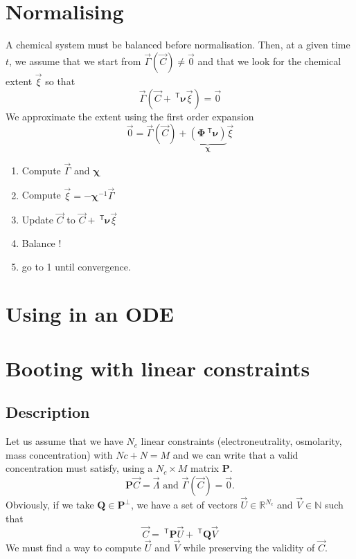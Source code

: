 \documentclass[aps]{revtex4}
\newcommand{\mymat}[1]{\bm{#1}}
\newcommand{\mytrn}[1]{~^{\mathsf{T}}{#1}}
\begin{document}
\section{Normalising}
A chemical system must be balanced before normalisation.
Then, at a given time $t$, we assume that we start from
$\vec{\Gamma}\left(\vec{C}\right)\not=\vec{0}$  and that we look for the chemical
extent $\vec{\xi}$ so that
\begin{equation}
	\vec{\Gamma}\left(\vec{C}+\mytrn{\mymat{\nu}}\vec{\xi}\right) = \vec{0}
\end{equation}
We approximate the extent using the first order expansion
\begin{equation}
	\vec{0} = \vec{\Gamma}\left(\vec{C}\right) + \underbrace{\left(\mymat{\Phi}\mytrn{\mymat{\nu}}\right)}_{\displaystyle \mymat{\chi}} 
	\vec{\xi}
\end{equation}	
\begin{enumerate}
\item Compute $\vec{\Gamma}$ and $\mymat{\chi}$
\item Compute $\vec{\xi}=-\mymat{\chi}^{-1} \vec{\Gamma}$
\item Update  $\vec{C}$ to $\vec{C}+\mytrn{\mymat{\nu}}\vec{\xi}$
\item Balance !
\item go to 1 until convergence.
\end{enumerate}

\section{Using in an ODE}

\section{Booting with linear constraints}
\subsection{Description}
Let us assume that we have $N_c$ linear constraints (electroneutrality, osmolarity, mass concentration) with $Nc+N=M$
and we can write that a valid concentration must satisfy, using a $N_c\times M$ matrix $\mymat{P}$. 
\begin{equation}
	\mymat{P} \vec{C} = \vec{\Lambda} \text{ and } \vec{\Gamma}\left(\vec{C}\right) = \vec{0}.
\end{equation}
Obviously, if we take $\mymat{Q}\in\mymat{P}^{\perp}$, we have a set of vectors $\vec{U}\in\mathbb{R}^{N_c}$ and $\vec{V}\in\mathbb{N}$ such that
\begin{equation}
	\vec{C} = \mytrn{\mymat{P}} \vec{U} + \mytrn{\mymat{Q}} \vec{V}
\end{equation}
We must find a way to compute $\vec{U}$ and $\vec{V}$ while preserving the validity of $\vec{C}$.
\end{document}
